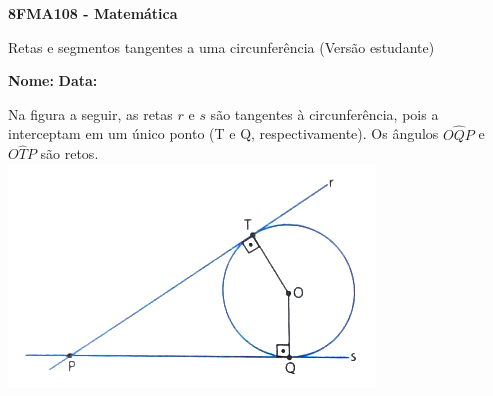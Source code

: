 \documentclass[a4paper,14pt]{article}
\begin{document}
	
	\noindent\textbf{8FMA108 - Matemática} 
	
	\begin{center}Retas e segmentos tangentes a uma circunferência (Versão estudante)
	\end{center}
	
	\noindent\textbf{Nome:} \underline{\hspace{10cm}}
	\noindent\textbf{Data:} \underline{\hspace{4cm}}
	
    \begin{multicols}{2}
    	\noindent Na figura a seguir, as retas $r$ e $s$ são tangentes à circunferência, pois a interceptam em um único ponto (T e Q, respectivamente). Os ângulos $O\hat{Q}P$ e $O\hat{T}P$ são retos. \\
    	\includegraphics[width=1\linewidth]{imagens_8FMA108/imagem1}
    	

\end{multicols}
\end{document}
